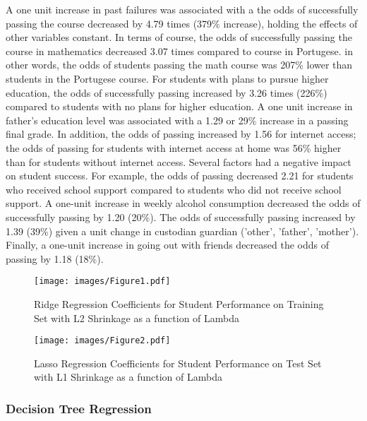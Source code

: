 \documentclass[sigconf]{acmart}
\begin{document}
A one unit increase in past failures was associated with a   the odds of successfully passing the 
course decreased by 4.79 times (379\% increase), holding the effects of other 
variables constant. In terms of course, the odds of successfully passing the 
course in mathematics decreased 3.07 times compared to course in Portugese. 
in other words, the odds of students passing the math course was 207\% lower 
than students in the Portugese course. For students with plans to pursue 
higher education, the odds of successfully passing increased by 3.26 times 
(226\%) compared to students with no plans for higher education. A one unit 
increase in father's education level was associated with a 1.29 or 29\% 
increase in a passing final grade. In addition, the odds of passing increased
by 1.56 for internet access; the odds of passing for students with internet 
access at home was 56\% higher than for students without internet access.  
Several factors had a negative impact on student success. For example, the 
odds of passing decreased 2.21 for students who received school support
compared to students who did not receive school support. A one-unit increase
in weekly alcohol consumption decreased the odds of successfully passing by 1.20 
(20\%). The odds of successfully passing increased by 1.39 (39\%) given a unit 
change in custodian guardian ('other', 'father', 'mother'). Finally, a one-unit 
increase in going out with friends decreased the odds of passing by 1.18 (18\%). 



\begin{figure}[!ht]
  \centering\texttt{[image: images/Figure1.pdf]}
  \caption{Ridge Regression Coefficients for Student Performance on Training Set
  with L2 Shrinkage as a function of Lambda}
  \label{f:Figure1}
\end{figure}





\begin{figure}[!ht]
  \centering\texttt{[image: images/Figure2.pdf]}
  \caption{Lasso Regression Coefficients for Student Performance on Test Set 
  with L1 Shrinkage as a function of Lambda}
  \label{f:Figure2}
\end{figure}




\subsubsection{Decision Tree Regression}
\end{document}
